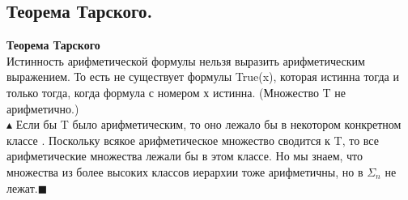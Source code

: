 \subsection{Теорема Тарского.}

\textbf{Теорема Тарского}\\
Истинность арифметической формулы нельзя выразить арифметическим выражением. То есть не существует формулы True(x), которая истинна тогда и только тогда, когда формула с номером х истинна. (Множество T не арифметично.)
\\
$\blacktriangle$ Если бы T было арифметическим, то оно лежало бы в некотором конкретном классе . Поскольку всякое арифметическое множество сводится к T, то все арифметические множества лежали бы в этом классе. Но мы знаем, что множества из более высоких классов иерархии тоже арифметичны, но в $\Sigma_n$ не лежат.$\blacksquare$